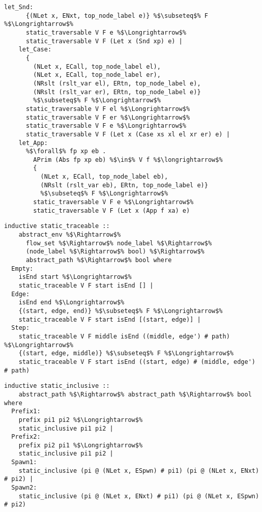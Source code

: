 \documentclass{article}
\begin{document}
\begin{lstlisting}[style=codestyle1, escapechar=\%]
    let_Snd:
      {(NLet x, ENxt, top_node_label e)} %$\subseteq$% F %$\Longrightarrow$%
      static_traversable V F e %$\Longrightarrow$%
      static_traversable V F (Let x (Snd xp) e) |
    let_Case:
      {
        (NLet x, ECall, top_node_label el),
        (NLet x, ECall, top_node_label er),
        (NRslt (rslt_var el), ERtn, top_node_label e),
        (NRslt (rslt_var er), ERtn, top_node_label e)}
        %$\subseteq$% F %$\Longrightarrow$%
      static_traversable V F el %$\Longrightarrow$%
      static_traversable V F er %$\Longrightarrow$%
      static_traversable V F e %$\Longrightarrow$%
      static_traversable V F (Let x (Case xs xl el xr er) e) |
    let_App:
      %$\forall$% fp xp eb .
        APrim (Abs fp xp eb) %$\in$% V f %$\longrightarrow$%
        {
          (NLet x, ECall, top_node_label eb),
          (NRslt (rslt_var eb), ERtn, top_node_label e)}
          %$\subseteq$% F %$\Longrightarrow$%
        static_traversable V F e %$\Longrightarrow$%
        static_traversable V F (Let x (App f xa) e)

  \end{lstlisting}

\begin{lstlisting}[style=codestyle1, escapechar=\%]
  inductive static_traceable ::
    abstract_env %$\Rightarrow$%
      flow_set %$\Rightarrow$% node_label %$\Rightarrow$%
      (node_label %$\Rightarrow$% bool) %$\Rightarrow$%
      abstract_path %$\Rightarrow$% bool where
  Empty:
    isEnd start %$\Longrightarrow$%
    static_traceable V F start isEnd [] |
  Edge:
    isEnd end %$\Longrightarrow$%
    {(start, edge, end)} %$\subseteq$% F %$\Longrightarrow$%
    static_traceable V F start isEnd [(start, edge)] |
  Step:
    static_traceable V F middle isEnd ((middle, edge') # path) %$\Longrightarrow$%
    {(start, edge, middle)} %$\subseteq$% F %$\Longrightarrow$%
    static_traceable V F start isEnd ((start, edge) # (middle, edge') # path)
  \end{lstlisting}

\begin{lstlisting}[style=codestyle1, escapechar=\%]
  inductive static_inclusive ::
    abstract_path %$\Rightarrow$% abstract_path %$\Rightarrow$% bool where
  Prefix1:
    prefix pi1 pi2 %$\Longrightarrow$%
    static_inclusive pi1 pi2 |
  Prefix2:
    prefix pi2 pi1 %$\Longrightarrow$%
    static_inclusive pi1 pi2 |
  Spawn1:
    static_inclusive (pi @ (NLet x, ESpwn) # pi1) (pi @ (NLet x, ENxt) # pi2) |
  Spawn2:
    static_inclusive (pi @ (NLet x, ENxt) # pi1) (pi @ (NLet x, ESpwn) # pi2)
  \end{lstlisting}
\end{document}
